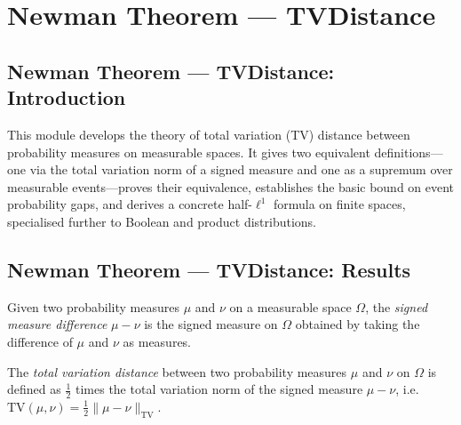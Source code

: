 \section{Newman Theorem --- TVDistance}
\subsection*{Newman Theorem --- TVDistance: Introduction}

This module develops the theory of total variation (TV) distance between probability
measures on measurable spaces.  It gives two equivalent definitions---one via the total
variation norm of a signed measure and one as a supremum over measurable events---proves
their equivalence, establishes the basic bound on event probability gaps, and derives a
concrete half-$\ell^1$ formula on finite spaces, specialised further to Boolean and
product distributions.

\subsection*{Newman Theorem --- TVDistance: Results}

\begin{definition}
\label{CommunicationComplexity.signedMeasureDiff}
\leanok
Given two probability measures $\mu$ and $\nu$ on a measurable space $\Omega$, the
\emph{signed measure difference} $\mu - \nu$ is the signed measure on $\Omega$ obtained
by taking the difference of $\mu$ and $\nu$ as measures.
\end{definition}

\begin{definition}
\label{CommunicationComplexity.tvDistance}
\leanok
{}
The \emph{total variation distance} between two probability measures $\mu$ and $\nu$ on
$\Omega$ is defined as $\tfrac{1}{2}$ times the total variation norm of the signed
measure $\mu - \nu$, i.e.\
$\mathrm{TV}(\mu,\nu) = \tfrac{1}{2}\|\mu - \nu\|_{\mathrm{TV}}$.
\end{definition}

